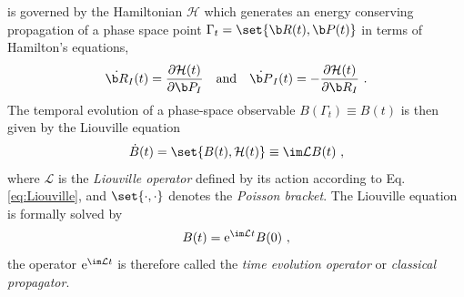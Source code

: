  is governed by the Hamiltonian $\mathcal H$ which generates an energy conserving propagation of a phase space point $\Gamma_t = \set{\b R (t), \b P (t)}$ in terms of Hamilton's equations,
\begin{align}
	\dot{\b R}_I (t) = \frac{\partial \mathcal H (t)}{\partial \b P_I} \quad\text{and}\quad
	\dot{\b P}_I (t) = -\frac{\partial \mathcal H (t)}{\partial \b R_I}~.
	\label{eq:stat.eom}
\end{align}
The temporal evolution of a phase-space observable $B (\Gamma_t) \equiv B(t)$ is then given by the Liouville equation~\cite{Tuckerman}
\begin{align}
	\dot{B} (t) = \set{B (t), \mathcal H (t)} \equiv \im \mathcal L B (t)~,
	\label{eq:Liouville}
\end{align}
where $\mathcal L$ is the \emph{Liouville operator} defined by its action according to Eq.\,\eqref{eq:Liouville}, and $\set{\cdot , \cdot}$ denotes the \emph{Poisson bracket}.
The Liouville equation is formally solved by
\begin{align}
	B (t) = {\rm e}^{\im \mathcal L t} B(0)~,
	\label{eq:B.time.evolution}
\end{align}
the operator ${\rm e}^{\im \mathcal L t}$ is therefore called the \emph{time evolution operator} or \emph{classical propagator}.

